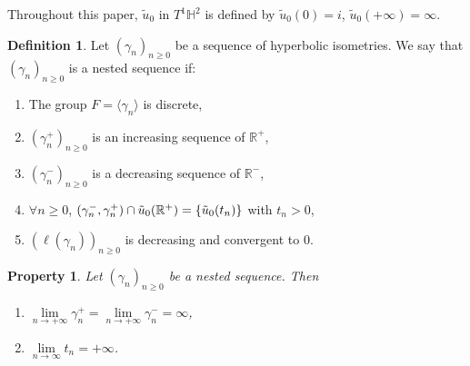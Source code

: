 \documentclass[a4paper,english,reqno]{amsart}
\newcommand{\R}{\mathbb{R}}
\renewcommand{\H}{\mathbb{H}}
\newcommand{\N}{\mathbb{N}} %
\newtheorem{property}{Property} %
\theoremstyle{definition}
\newtheorem{definition}[theorem]{Definition}
\numberwithin{equation}{section}
\begin{document}
		
Throughout this paper, $\tilde u_0$ in $T^1\H^2$ is defined by $\tilde u_0(0)=i$, $\tilde u_0(+\infty)=\infty$.
	
	\begin{definition}\label{nested_sequence}
%			
Let $(\gamma_n)_{n\geq 0}$ be a sequence of hyperbolic isometries. We say that  $(\gamma_n)_{n\geq 0}$ is a nested sequence if:
\begin{enumerate}
	\item The group $F=\langle \gamma_n \rangle$ is discrete,
	\item  $(\gamma_n^+)_{n\geq 0}$ is an increasing sequence of $\R^+$,
	\item  $(\gamma_n^-)_{n\geq 0}$ is a decreasing sequence of $\R^-$,
	\item $\forall n\geq 0$, $(\gamma_n^-,\gamma_n^+)\cap \Tilde u_0(\R^+)=\{ \tilde u_0(t_n) \}$ with $t_n>0$,
	\item $(\ell(\gamma_n))_{n\geq 0}$ is decreasing and convergent to $0$.
\end{enumerate}
	\end{definition}
	
	\begin{property}
		Let $(\gamma_n)_{n\geq 0}$ be a nested sequence. Then
		\begin{enumerate}
				\item $\lim\limits_{n\to+\infty}\gamma_n^+=\lim\limits_{n\to+\infty}\gamma_n^-=\infty$,
			\item $\lim\limits_{n\to \infty} t_n=+\infty$.
		
		\end{enumerate}
	\end{property}
	
\end{document}
